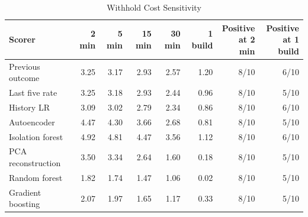 \begin{table}[htbp]
\centering
\scriptsize\setlength{\tabcolsep}{1.5pt}
\caption{Withhold Cost Sensitivity}
\label{tab:cost_sweep}
\begin{tabular}{lrrrrrrr}
\toprule
Scorer & 2 min & 5 min & 15 min & 30 min & 1 build & \shortstack{Positive\\at 2 min} & \shortstack{Positive\\at 1 build} \\
\midrule
Previous outcome & 3.25 & 3.17 & 2.93 & 2.57 & 1.20 & 8/10 & 6/10 \\
Last five rate & 3.25 & 3.18 & 2.93 & 2.44 & 0.96 & 8/10 & 5/10 \\
History LR & 3.09 & 3.02 & 2.79 & 2.34 & 0.86 & 8/10 & 6/10 \\
Autoencoder & 4.47 & 4.30 & 3.66 & 2.68 & 0.81 & 8/10 & 5/10 \\
Isolation forest & 4.92 & 4.81 & 4.47 & 3.56 & 1.12 & 8/10 & 6/10 \\
PCA reconstruction & 3.50 & 3.34 & 2.64 & 1.60 & 0.18 & 8/10 & 5/10 \\
Random forest & 1.82 & 1.74 & 1.47 & 1.06 & 0.02 & 8/10 & 5/10 \\
Gradient boosting & 2.07 & 1.97 & 1.65 & 1.17 & 0.33 & 8/10 & 5/10 \\
\bottomrule
\end{tabular}
\end{table}
